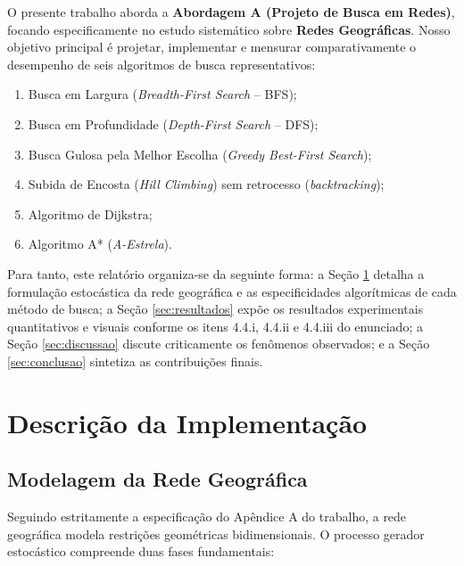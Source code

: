 \documentclass[a4paper,10pt,twocolumn]{article}
\begin{document}
O presente trabalho aborda a \textbf{Abordagem A (Projeto de Busca em Redes)}, focando especificamente no estudo sistemático sobre \textbf{Redes Geográficas}. Nosso objetivo principal é projetar, implementar e mensurar comparativamente o desempenho de seis algoritmos de busca representativos:
\begin{enumerate}
    \item Busca em Largura (\textit{Breadth-First Search} -- BFS);
    \item Busca em Profundidade (\textit{Depth-First Search} -- DFS);
    \item Busca Gulosa pela Melhor Escolha (\textit{Greedy Best-First Search});
    \item Subida de Encosta (\textit{Hill Climbing}) sem retrocesso (\textit{backtracking});
    \item Algoritmo de Dijkstra;
    \item Algoritmo A* (\textit{A-Estrela}).
\end{enumerate}

Para tanto, este relatório organiza-se da seguinte forma: a Seção \ref{sec:implementacao} detalha a formulação estocástica da rede geográfica e as especificidades algorítmicas de cada método de busca; a Seção \ref{sec:resultados} expõe os resultados experimentais quantitativos e visuais conforme os itens 4.4.i, 4.4.ii e 4.4.iii do enunciado; a Seção \ref{sec:discussao} discute criticamente os fenômenos observados; e a Seção \ref{sec:conclusao} sintetiza as contribuições finais.

\section{Descrição da Implementação}
\label{sec:implementacao}

\subsection{Modelagem da Rede Geográfica}

Seguindo estritamente a especificação do Apêndice A do trabalho, a rede geográfica modela restrições geométricas bidimensionais. O processo gerador estocástico compreende duas fases fundamentais:
\end{document}
